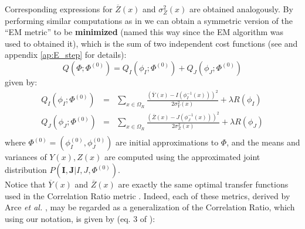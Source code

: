Corresponding expressions for $\overline{Z}(x)$ and $\sigma_{Z}^{2}(x)$ are obtained analogously. By performing similar computations as in \cite{Arce-santana2014} we can obtain a symmetric version of the ``EM metric'' to be \textbf{minimized} (named this way since the EM algorithm was used to obtained it), which is the sum of two independent cost functions (see \cite{Arce-santana2014} and appendix \ref{ap:E_step} for details):
\begin{equation}\label{eq:SyNEM_energy}
    Q(\Phi; \Phi^{(0)}) = Q_{I}(\phi_{I}; \Phi^{(0)}) + Q_{J}(\phi_{J}; \Phi^{(0)})
\end{equation}
given by:
\begin{equation}\label{eq:SyNEM_energy_split}
    \begin{array}{lll}
        Q_{I}(\phi_{I}; \Phi^{(0)}) &=& \sum_{x \in \Omega_{R}} \frac{\left(\overline{Y}(x) - I(\phi_{I}^{-1}(x))\right)^{2}}{2\sigma^{2}_{Y}(x)} + \lambda R(\phi_{I}) \\
        Q_{J}(\phi_{J}; \Phi^{(0)}) &=& \sum_{x \in \Omega_{R}} \frac{\left(\overline{Z}(x) - J(\phi_{J}^{-1}(x))\right)^{2}}{2\sigma^{2}_{Z}(x)} + \lambda R(\phi_{J}) \\
    \end{array}
\end{equation}
where $\Phi^{(0)} = (\phi_{I}^{(0)}, \phi_{J}^{(0)})$ are initial approximations to $\Phi$, and the means and variances of $Y(x), Z(x)$ are computed using the approximated joint distribution $P(\mathbf{I}, \mathbf{J} | I, J, \Phi^{(0)})$.\\

Notice that $\overline{Y}(x)$ and $\overline{Z}(x)$ are exactly the same optimal transfer functions used in the Correlation Ratio metric \cite{Roche1998} \cite{Roche2000}. Indeed, each of these metrics, derived by Arce {\it et al.} \cite{Arce-santana2014}, may be regarded as a generalization of the Correlation Ratio, which using our notation, is given by (eq. 3 of \cite{Roche1998}):

